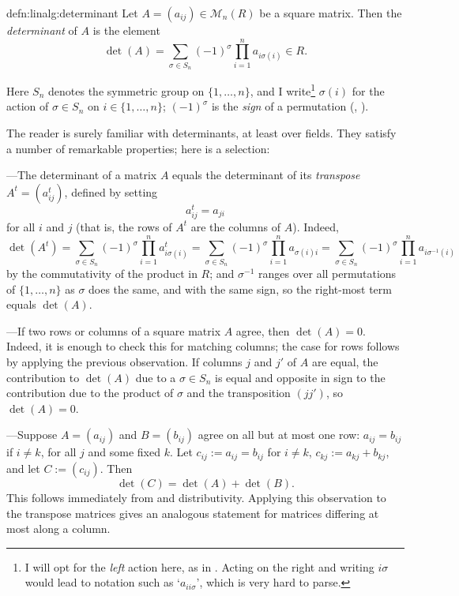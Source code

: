 \begin{defn}{}{defn:linalg:determinant}
  Let $A = (a_{ij}) \in \mathcal{M}_n(R)$ be a square matrix. Then the
  \emph{determinant} of $A$ is the element
  \[
    \det(A) = \sum_{\sigma \in S_n} (-1)^\sigma \prod_{i=1}^n
    a_{i\sigma(i)} \in R.
  \]
\end{defn}
Here $S_n$ denotes the symmetric group on $\{1, \dots, n\}$, and I
write\footnote{I will opt for the \emph{left} action here, as in
  . Acting on the right and
  writing $i\sigma$ would lead to notation such as `$a_{i i\sigma}$',
  which is very hard to parse.} $\sigma(i)$ for
the action of $\sigma \in S_n$ on $i \in \{1, \dots, n\}$;
$(-1)^\sigma$ is the \emph{sign} of a permutation
(, ).

The reader is surely familiar with determinants, at least over fields.
They satisfy a number of remarkable properties; here is a selection:

---The determinant of a matrix $A$ equals the determinant of its
\emph{transpose} $A^t = (a_{ij}^t)$, defined by setting
\[
  a_{ij}^t = a_{ji}
\]
for all $i$ and $j$ (that is, the rows of $A^t$ are the columns of
$A$). Indeed,
\[
  \det(A^t) = \sum_{\sigma \in S_n} (-1)^\sigma \prod_{i=1}^n
  a^t_{i\sigma(i)} = \sum_{\sigma \in S_n} (-1)^\sigma \prod_{i=1}^n
  a_{\sigma(i)i} = \sum_{\sigma \in S_n} (-1)^\sigma \prod_{i=1}^n
  a_{i\sigma^{-1}(i)}
\]
by the commutativity of the product in $R$; and $\sigma^{-1}$ ranges
over all permutations of $\{1, \dots, n\}$ as $\sigma$ does the same,
and with the same sign, so the right-most term equals $\det(A)$.

---If two rows or columns of a square matrix $A$ agree, then
$\det(A) = 0$. Indeed, it is enough to check this for matching
columns; the case for rows follows by applying the previous
observation. If columns $j$ and $j'$ of $A$ are equal, the
contribution to $\det(A)$ due to a $\sigma \in S_n$ is equal and
opposite in sign to the contribution due to the product of $\sigma$
and the transposition $(jj')$, so $\det(A) = 0$.

---Suppose $A = (a_{ij})$ and $B = (b_{ij})$ agree on all but at most
one row: $a_{ij} = b_{ij}$ if $i \neq k$, for all $j$ and some fixed
$k$. Let $c_{ij} := a_{ij} = b_{ij}$ for $i \neq k$,
$c_{kj} := a_{kj} + b_{kj}$, and let $C := (c_{ij})$. Then
\[
  \det(C) = \det(A) + \det(B).
\]
This follows immediately from  and distributivity.
Applying this observation to the transpose matrices gives an analogous
statement for matrices differing at most along a column.

